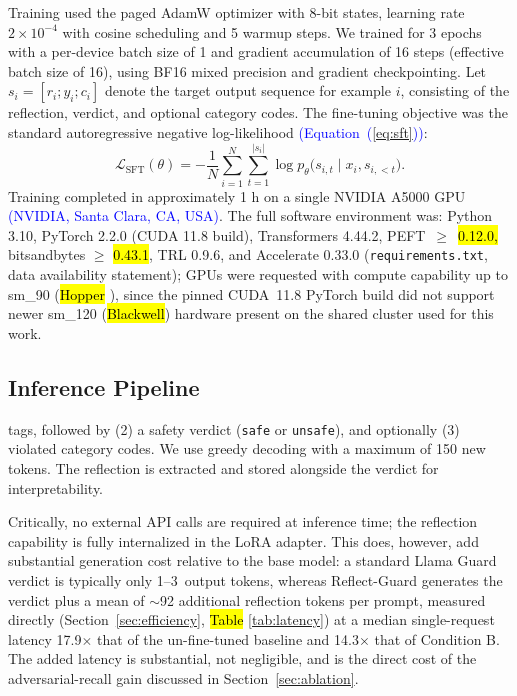 \documentclass[superintelligence,article,accept,moreauthors]{Definitions/mdpi}
\newcommand{\authchg}[1]{\textcolor{blue}{#1}}
\begin{document}
Training used the paged AdamW optimizer with 8-bit states, learning rate $2 \times 10^{-4}$ with cosine scheduling and 5 warmup steps. We trained for 3 epochs with a per-device batch size of 1 and gradient accumulation of 16 steps (effective batch size of 16), using BF16 mixed precision and gradient checkpointing. Let $s_i = [r_i; y_i; c_i]$ denote the target output sequence for example $i$, consisting of the reflection, verdict, and optional category codes. The fine-tuning objective was the standard autoregressive negative log-likelihood \authchg{(Equation~(\ref{eq:sft}))}:
\begin{equation}
  \mathcal{L}_{\text{SFT}}(\theta) = - \frac{1}{N} \sum_{i=1}^{N} \sum_{t=1}^{|s_i|}
  \log p_{\theta}\bigl(s_{i,t} \mid x_i, s_{i,<t}\bigr).\label{eq:sft}
\end{equation}
Training completed in approximately 1 h on a single NVIDIA A5000 GPU \authchg{(NVIDIA, Santa Clara, CA, USA)}. The full software environment was: Python 3.10, PyTorch 2.2.0 (CUDA 11.8 build), Transformers 4.44.2, \mbox{PEFT $\geq$\hl{ 0.12.0,}
} bitsandbytes $\geq$ \hl{0.43.1}, TRL 0.9.6, and Accelerate 0.33.0 (\texttt{requirements.txt}, data availability statement); GPUs were requested with compute capability up to sm\_90 (\hl{Hopper}
), since the pinned CUDA~11.8 PyTorch build did not support newer sm\_120 (\hl{Blackwell}) hardware present on the shared cluster used for this work.

\subsection{Inference Pipeline}

 tags, followed by (2) a safety verdict (\texttt{safe} or \texttt{unsafe}), and optionally (3) violated category codes. We use greedy decoding with a maximum of 150 new tokens. The reflection is extracted and stored alongside the verdict for interpretability.

Critically, no external API calls are required at inference time; the reflection capability is fully internalized in the LoRA adapter. This does, however, add substantial generation cost relative to the base model: a standard Llama Guard verdict is typically only 1--3~output tokens, whereas Reflect-Guard generates the verdict plus a mean of $\sim$92 additional reflection tokens per prompt, measured directly (Section~\ref{sec:efficiency}, \hl{Table}
 \ref{tab:latency}) at a median single-request latency 17.9$\times$ that of the un-fine-tuned baseline and 14.3$\times$ that of Condition B. The added latency is substantial, not negligible, and is the direct cost of the adversarial-recall gain discussed in Section~\ref{sec:ablation}.
\end{document}
